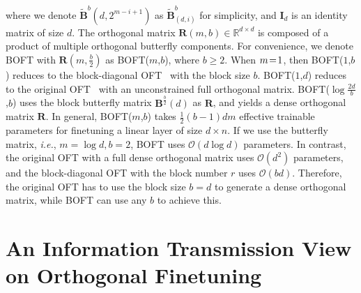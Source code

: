 where we denote $\tilde{\bm{B}}^b(d,2^{m - i+1})$ as $\tilde{\bm{B}}^b_{(d,i)}$ for simplicity, and $\bm{I}_d$ is an identity matrix of size $d$. The orthogonal matrix $\bm{R}(m,b)\in\mathbb{R}^{d\times d}$ is composed of a product of multiple orthogonal butterfly components. For convenience, we denote BOFT with $\bm{R}(m,\frac{b}{2})$ as BOFT($m$,$b$), where $b\geq 2$. When $\thickmuskip=2mu \medmuskip=2mu m=1$, then BOFT($1$,$b$) reduces to the block-diagonal OFT~\cite{qiu2023controlling} with the block size $b$. BOFT($1$,$d$) reduces to the original OFT~\cite{qiu2023controlling} with an unconstrained full orthogonal matrix. BOFT($\log \frac{2d}{b}$,$b$) uses the block butterfly matrix $\bm{B}^{\frac{b}{2}}(d)$ as $\bm{R}$, and yields a dense orthogonal matrix $\bm{R}$. In general, BOFT($m$,$b$) takes $\frac{1}{2}(b-1)dm$ effective trainable parameters for finetuning a linear layer of size $d\times n$. If we use the butterfly matrix, \emph{i.e.}, $m=\log d,b=2$, BOFT uses $\mathcal{O}(d\log d)$ parameters. In contrast, the original OFT with a full dense orthogonal matrix uses $\mathcal{O}(d^2)$ parameters, and the block-diagonal OFT with the block number $r$ uses $\mathcal{O}(bd)$. Therefore, the original OFT has to use the block size $b=d$ to generate a dense orthogonal matrix, while BOFT can use any $b$ to achieve this.

\section{An Information Transmission View on Orthogonal Finetuning}


